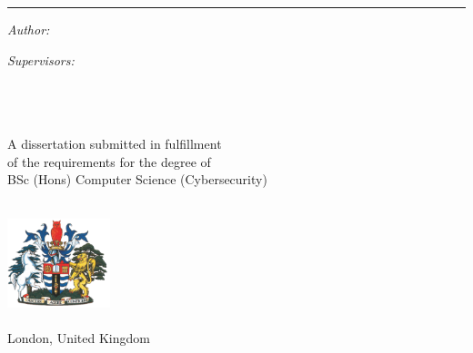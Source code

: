 \begin{titlepage}
  \doublespacing{}
  \large
  \hfill
  \vfill
  \vspace*{0.5cm}
  \begin{center}
    \doublespacing{}
    \textcolor{Blue}{\huge\textbf{\myTitle}}
  \end{center}
  \vspace{1.25cm}
  \hrule
  \vspace{1.5cm}
  \onehalfspacing{}
  \begin{center}

    \begin{minipage}[t]{0.5\textwidth}
      \begin{flushleft}
        \emph{Author:}\\
        \href{\myWebsite}{{\myFirstName} \textsc{\myLastName}}
      \end{flushleft}
    \end{minipage}
    \begin{minipage}[t]{0.4\textwidth}
      \begin{flushright}
        \emph{Supervisors:} \\
        \href{\myProfWebsite}{{\myProfTitle} {\myProfFirstName} \textsc{\myProfLastName}}\\
        \href{\myOtherProfWebsite}{{\myOtherProfTitle} {\myOtherProfFirstName} \textsc{\myOtherProfLastName}}\\
      \end{flushright}
    \end{minipage}\\[1.5cm]

    A dissertation submitted in fulfillment\\
    of the requirements for the degree of\\
    {BSc (Hons) Computer Science (Cybersecurity)}\\[1cm]

    \myDepartment\\
    \myFaculty{}

    \hfill
    \vfill

    \includegraphics[width=3cm]{figures/greenwich-coat-of-arms}\\
    \href{https://www.gre.ac.uk/}{\myUni}\\
    London, United Kingdom\\[2em]
    {\mySubmissionMonth} {\mySubmissionYear}
  \end{center}
\end{titlepage}
